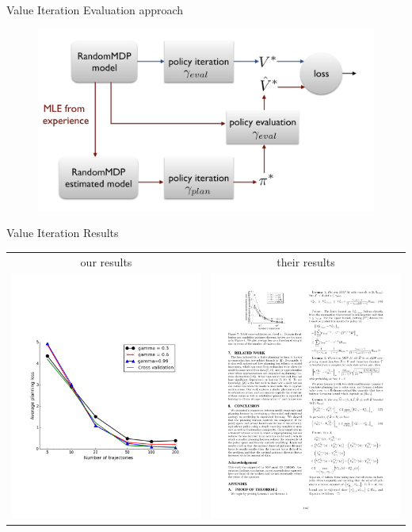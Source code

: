 \documentclass{beamer}
\begin{document}
\begin{frame}{Value Iteration Evaluation approach}
\begin{figure}
\includegraphics[page=1,width=1\textwidth]{RandomMDPEvaluation.png}
\end{figure}


\end{frame}

\begin{frame}{Value Iteration Results}
\begin{tabular}{cc}
our results & their results \\
	\includegraphics[page=1,height=.55\textheight,width=.5\textwidth]{../results/figure_2.pdf} &
	\includegraphics[page=1,width=.41\textwidth]{../results/originalCV.pdf}
\end{tabular}
\end{frame}
\end{document}
